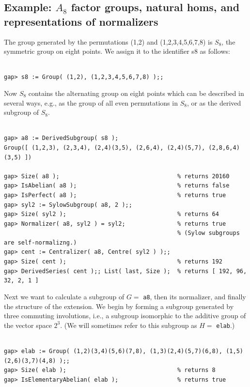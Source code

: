 \subsection{Example: $A_8$ factor groups, natural homs, and representations of
  normalizers}\hspace{-2mm}\protect\footnotemark
{}
The group generated by the permutations (1,2) and (1,2,3,4,5,6,7,8) is $S_8$,
the symmetric group on eight points.  We assign it to the identifier s8 
as follows:
{\codesize
\begin{verbatim}

gap> s8 := Group( (1,2), (1,2,3,4,5,6,7,8) );;

\end{verbatim}}
\noindent Now $S_8$ contains the alternating group on eight points which can be described in
several ways, e.g., as the group of all even permutations in $S_8$, or as the derived
subgroup of $S_8$.
{\codesize
\begin{verbatim}

gap> a8 := DerivedSubgroup( s8 );  
Group([ (1,2,3), (2,3,4), (2,4)(3,5), (2,6,4), (2,4)(5,7), (2,8,6,4)(3,5) ])

gap> Size( a8 );                                  % returns 20160
gap> IsAbelian( a8 );                             % returns false
gap> IsPerfect( a8 );                             % returns true
gap> syl2 := SylowSubgroup( a8, 2 );; 
gap> Size( syl2 );                                % returns 64
gap> Normalizer( a8, syl2 ) = syl2;               % returns true   
                                                  % (Sylow subgroups are self-normalizng.)
gap> cent := Centralizer( a8, Centre( syl2 ) );; 
gap> Size( cent );                                % returns 192
gap> DerivedSeries( cent );; List( last, Size );  % returns [ 192, 96, 32, 2, 1 ]

\end{verbatim}}
\noindent Next we want to calculate a subgroup of $G = $ {\tt a8}, then its normalizer, and finally
the structure of the extension. We begin by forming a subgroup generated by three commuting involutions,
i.e., a subgroup isomorphic to the additive group of the vector space $2^3$.
(We will sometimes refer to this subgroup as $H= $ {\tt elab}.)  
{\codesize
\begin{verbatim}

gap> elab := Group( (1,2)(3,4)(5,6)(7,8), (1,3)(2,4)(5,7)(6,8), (1,5)(2,6)(3,7)(4,8) );;
gap> Size( elab );                                % returns 8
gap> IsElementaryAbelian( elab );                 % returns true

\end{verbatim}}
